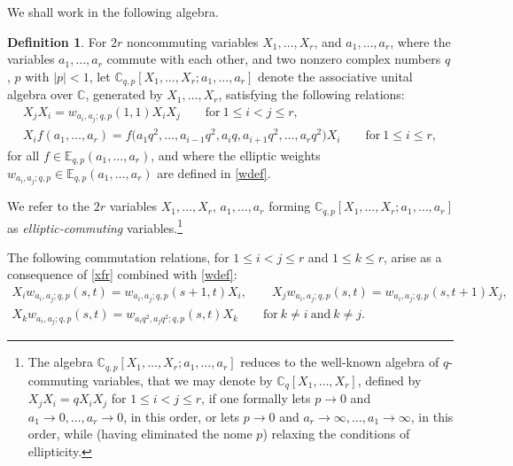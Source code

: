 \documentclass[10pt,a4paper]{amsart}
\numberwithin{equation}{section}
\theoremstyle{definition}
\newtheorem{Definition}[Theorem]{Definition}
\newcommand{\C}{\mathbb C}
\newcommand{\E}{\mathbb E}
\begin{document}
We shall work in the following algebra.
\begin{Definition}\label{defear}
For $2r$ noncommuting variables $X_1,\dots,X_r$, and $a_1,\dots,a_r$,
where the variables $a_1,\dots,a_r$ commute with each other,
and two nonzero complex numbers $q$, $p$ with $|p|<1$, let $\C_{q,p}[X_1,\dots,X_r;a_1,\dots,a_r]$
denote the associative
unital algebra over $\C$, generated by $X_1,{\dots},X_r$,
satisfying the following relations:
\begin{subequations}\label{defeaeqr}
\begin{gather}
X_jX_i=w_{a_i,a_j;q,p}(1,1) X_iX_j
\qquad\text{for}\ 1\le i<j\le r,\label{elleqr}\\
X_i f(a_1,\dots,a_r)=f\bigl(a_1q^2,\dots,a_{i-1}q^2,a_iq,
a_{i+1}q^2,\dots,a_r q^2\bigr) X_i\qquad\text{for}\ 1\le i\le r,\label{xfr}
\end{gather}
\end{subequations}
for all $f\in\E_{q,p}(a_1,\dots,a_r)$,
and where the elliptic weights
$w_{a_i,a_j;q,p}\in\E_{q,p}(a_1,\dots,a_r)$
are defined in \eqref{wdef}.
\end{Definition}
We refer to the $2r$ variables $X_1,\dots,X_r$, $a_1,\dots,a_r$
forming $\C_{q,p}[X_1,\dots,X_r;a_1,\dots,a_r]$
as {\em elliptic-commuting} variables.\footnote{The algebra
 $\C_{q,p}[X_1,\dots,X_r;a_1,\dots,a_r]$
reduces to the well-known algebra of $q$-commuting
variables, that we may denote by $\C_q[X_1,\dots,X_r]$,
defined by $X_jX_i=qX_iX_j$ for $1\le i<j\le r$,
if one formally lets $p\to 0$ and~${a_1\to 0,\dots,a_r\to 0}$,
in this order, or lets $p\to 0$ and $a_r\to\infty,\dots,a_1\to\infty$,
in this order, while (having eliminated the nome $p$) relaxing the
conditions of ellipticity.}

The following commutation relations, for $1\le i<j\le r$
and $1\le k\le r$, arise as a consequence of
\eqref{xfr} combined with \eqref{wdef}:
\begin{gather*}
 X_i w_{a_i,a_j;q,p}(s,t)=w_{a_i,a_j;q,p}(s+1,t) X_i,\qquad
 X_j w_{a_i,a_j;q,p}(s,t)=w_{a_i,a_j;q,p}(s,t+1) X_j,\\
 X_k w_{a_i,a_j;q,p}(s,t)=w_{a_iq^2,a_jq^2;q,p}(s,t) X_k
 \qquad\text{for}\ k\neq i\ \text{and}\ k\neq j.
\end{gather*}
\end{document}
